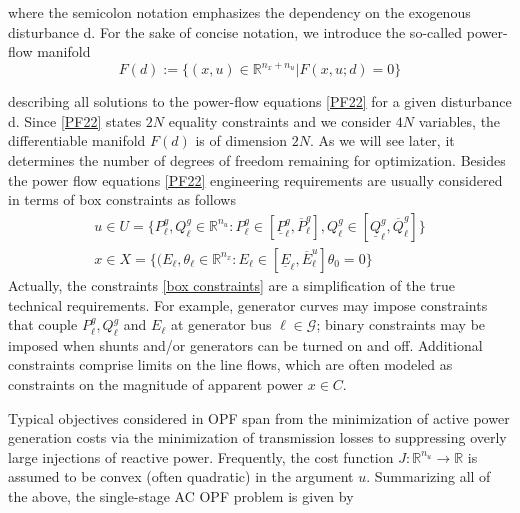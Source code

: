 where the semicolon notation emphasizes the dependency on the exogenous disturbance d. For the sake of concise notation, we introduce the so-called power-flow manifold
\[F(d):=\{(x,u)\in\mathbb{R}^{n_x+ n_u}| F(x,u;d)=0\}\]
 
describing all solutions to the power-flow equations \eqref{PF22} for a given disturbance d. Since \eqref{PF22} states $2N$
 equality constraints and we consider $4N$
 variables, the differentiable manifold $F(d)$
is of dimension $2N$. As we will see later, it determines the number of degrees of freedom remaining for optimization. 
 Besides the power flow equations \eqref{PF22} engineering requirements are usually considered in terms of box constraints as follows
 \begin{subequations}
 \label{box constraints}
\begin{align}
u\in U=\{P_{\ell}^g, Q_{\ell}^g\in \mathbb{R}^{n_u}: P_{\ell}^g\in [\underline{P}_{\ell}^g,\overline{P}_{\ell}^g], Q_{\ell}^g\in [\underline{Q}_{\ell}^g,\overline{Q}_{\ell}^g]\}\\
x\in X=\{(E_{\ell},\theta_{\ell}\in \mathbb{R}^{n_x}: E_{\ell}\in [\underline{E}_{\ell},\overline{E}_{\ell}^u]\theta_0=0\}
\end{align}
 \end{subequations}
 Actually, the constraints \eqref{box constraints} are a simplification of the true technical requirements. For example, generator curves may impose constraints that couple  $P_{\ell}^g,Q_{\ell}^g$ and $E_{\ell}$
 at generator bus $\ell\in\mathcal{G}$; binary constraints may be imposed when shunts and/or generators can be turned on and off.
 Additional constraints comprise limits on the line flows, which are often modeled as constraints on the magnitude of apparent power $x\in C$.
 
 
 Typical objectives considered in OPF span from the minimization of active power generation costs via the minimization of transmission losses to suppressing overly large injections of reactive power. Frequently, the cost function $J:\mathbb{R}^{n_u}\rightarrow \mathbb{R}$
 is assumed to be convex (often quadratic) in the argument $u$. Summarizing all of the above, the single-stage AC OPF problem is given by
 
